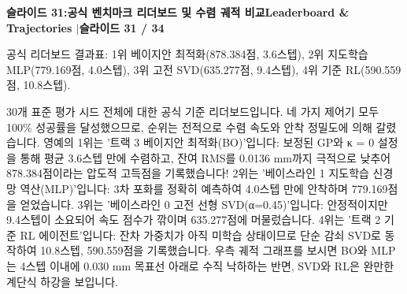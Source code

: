 \documentclass[11pt,a4paper]{article}
\begin{document}
\clearpage
\hypertarget{slide.31}{}
{}
\noindent\begin{tcolorbox}[colback=navy,colframe=navy,left=6pt,right=6pt,top=3pt,bottom=3pt,boxrule=0pt,arc=2pt]
{\large\bfseries\color{white}슬라이드 31:\enspace 공식 벤치마크 리더보드 및 수렴 궤적 비교}\hfill{\footnotesize\bfseries\color{white!85!lightbg}Leaderboard \& Trajectories \enspace$|$\enspace 슬라이드 31 / 34}
\end{tcolorbox}
\vspace{0.2em}
\begin{tcolorbox}[colback=lightbg,colframe=bordergray,title={\footnotesize\bfseries\color{darkgray}슬라이드 시각 구성 요약},fontupper=\small,left=6pt,right=6pt,top=2.5pt,bottom=2.5pt,boxrule=0.6pt,arc=2.5pt]
공식 리더보드 결과표: 1위 베이지안 최적화(878.384점, 3.6스텝), 2위 지도학습 MLP(779.169점, 4.0스텝), 3위 고전 SVD(635.277점, 9.4스텝), 4위 기준 RL(590.559점, 10.8스텝).
\end{tcolorbox}
\vspace{0.2em}
\begin{tcolorbox}[colback=white,colframe=primaryblue,title={\footnotesize\bfseries\color{white}발표자 구두 대본 (Spoken Script)},fontupper=\small,left=6pt,right=6pt,top=3pt,bottom=3pt,boxrule=0.8pt,arc=2.5pt]
30개 표준 평가 시드 전체에 대한 공식 기준 리더보드입니다. 네 가지 제어기 모두 100\% 성공률을 달성했으므로, 순위는 전적으로 수렴 속도와 안착 정밀도에 의해 갈렸습니다. 영예의 1위는 '트랙 3 베이지안 최적화(BO)'입니다: 보정된 GP와 κ = 0 설정을 통해 평균 3.6스텝 만에 수렴하고, 잔여 RMS를 0.0136 mm까지 극적으로 낮추어 878.384점이라는 압도적 고득점을 기록했습니다! 2위는 '베이스라인 1 지도학습 신경망 역산(MLP)'입니다: 3차 포화를 정확히 예측하여 4.0스텝 만에 안착하며 779.169점을 얻었습니다. 3위는 '베이스라인 0 고전 선형 SVD(α=0.45)'입니다: 안정적이지만 9.4스텝이 소요되어 속도 점수가 깎이며 635.277점에 머물렀습니다. 4위는 '트랙 2 기준 RL 에이전트'입니다: 잔차 가중치가 아직 미학습 상태이므로 단순 감쇠 SVD로 동작하여 10.8스텝, 590.559점을 기록했습니다. 우측 궤적 그래프를 보시면 BO와 MLP는 4스텝 이내에 0.030 mm 목표선 아래로 수직 낙하하는 반면, SVD와 RL은 완만한 계단식 하강을 보입니다.
\end{tcolorbox}
\vspace{0.2em}
\end{document}
